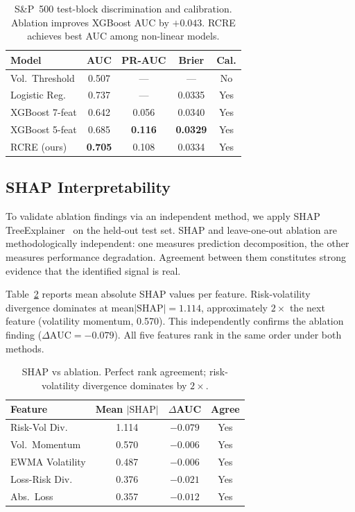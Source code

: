 \documentclass[sigconf]{acmart}
\begin{document}
\begin{table}[t]
\caption{S\&P~500 test-block discrimination and calibration. Ablation improves XGBoost AUC by $+0.043$. RCRE achieves best AUC among non-linear models.}
\label{tab:disc}
\begin{tabular}{lcccc}
\toprule
Model & AUC & PR-AUC & Brier & Cal. \\
\midrule
Vol.\ Threshold   & 0.507 & ---   & ---    & No  \\
Logistic Reg.\    & 0.737 & ---   & 0.0335 & Yes \\
XGBoost 7-feat    & 0.642 & 0.056 & 0.0340 & Yes \\
XGBoost 5-feat    & 0.685 & \textbf{0.116} & \textbf{0.0329} & Yes \\
RCRE (ours)       & \textbf{0.705} & 0.108 & 0.0334 & Yes \\
\bottomrule
\end{tabular}
\end{table}

\subsection{SHAP Interpretability}

To validate ablation findings via an independent method, we apply SHAP TreeExplainer~\cite{lundberg2017unified} on the held-out test set. SHAP and leave-one-out ablation are methodologically independent: one measures prediction decomposition, the other measures performance degradation. Agreement between them constitutes strong evidence that the identified signal is real.

Table~\ref{tab:shap} reports mean absolute SHAP values per feature. Risk-volatility divergence dominates at mean$|\text{SHAP}|{=}1.114$, approximately $2\times$ the next feature (volatility momentum, 0.570). This independently confirms the ablation finding ($\Delta\text{AUC} = -0.079$). All five features rank in the same order under both methods.

\begin{table}[t]
\caption{SHAP vs ablation. Perfect rank agreement; risk-volatility
divergence dominates by $2\times$.}
\label{tab:shap}
\small
\begin{tabular}{lccc}
\toprule
\textbf{Feature} & \textbf{Mean $|\text{SHAP}|$} & \textbf{$\Delta$AUC} & \textbf{Agree} \\
\midrule
Risk-Vol Div.            & 1.114 & $-0.079$ & Yes \\
Vol.\ Momentum           & 0.570 & $-0.006$ & Yes \\
EWMA Volatility          & 0.487 & $-0.006$ & Yes \\
Loss-Risk Div.           & 0.376 & $-0.021$ & Yes \\
Abs.\ Loss               & 0.357 & $-0.012$ & Yes \\
\bottomrule
\end{tabular}
\end{table}
\end{document}
